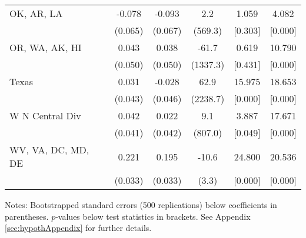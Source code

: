 \begin{landscape}
\begin{table}[ht]
{\begin{threeparttable}
\begin{tabular}{lccccc}
OK, AR, LA & -0.078 & -0.093 & 2.2 & 1.059 & 4.082 \\ 
 & (0.065) & (0.067) & (569.3) & [0.303] & [0.000] \\ 
OR, WA, AK, HI & 0.043 & 0.038 & -61.7 & 0.619 & 10.790 \\ 
 & (0.050) & (0.050) & (1337.3) & [0.431] & [0.000] \\ 
Texas & 0.031 & -0.028 & 62.9 & 15.975 & 18.653 \\ 
 & (0.043) & (0.046) & (2238.7) & [0.000] & [0.000] \\ 
W N Central Div & 0.042 & 0.022 & 9.1 & 3.887 & 17.671 \\ 
 & (0.041) & (0.042) & (807.0) & [0.049] & [0.000] \\ 
WV, VA, DC, MD, DE & 0.221 & 0.195 & -10.6 & 24.800 & 20.536 \\ 
 & (0.033) & (0.033) & (3.3) & [0.000] & [0.000] \\ 
\bottomrule
\end{tabular}
{\footnotesize {\raggedright Notes: Bootstrapped standard errors (500 replications) below coefficients in parentheses. $p$-values below test statistics in brackets. See Appendix \ref{sec:hypothAppendix} for further details.}}
\end{threeparttable}
}
\end{table}
\end{landscape}
